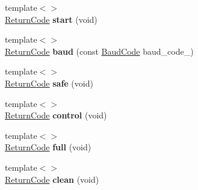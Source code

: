 \begin{DoxyCompactItemize}
\item 
\hypertarget{classroomba_1_1_open_interface_a96b78c979bf8aa82f4c76f0d156fb7f4}{{\footnotesize template$<$$>$ }\\\hyperlink{namespaceroomba_aff53babe0af88b1ea8b066fd18b8f23f}{Return\+Code} {\bfseries start} (void)}\label{classroomba_1_1_open_interface_a96b78c979bf8aa82f4c76f0d156fb7f4}

\item 
\hypertarget{classroomba_1_1_open_interface_a71f4bcde46126e045681d55437927dad}{{\footnotesize template$<$$>$ }\\\hyperlink{namespaceroomba_aff53babe0af88b1ea8b066fd18b8f23f}{Return\+Code} {\bfseries baud} (const \hyperlink{namespaceroomba_a303ba447b12fc77bc24977a1a7ec6d6c}{Baud\+Code} baud\+\_\+code\+\_\+)}\label{classroomba_1_1_open_interface_a71f4bcde46126e045681d55437927dad}

\item 
\hypertarget{classroomba_1_1_open_interface_a044f115b2d5bbd1dc644e71978940c60}{{\footnotesize template$<$$>$ }\\\hyperlink{namespaceroomba_aff53babe0af88b1ea8b066fd18b8f23f}{Return\+Code} {\bfseries safe} (void)}\label{classroomba_1_1_open_interface_a044f115b2d5bbd1dc644e71978940c60}

\item 
\hypertarget{classroomba_1_1_open_interface_a0c5f4aedca9850d8b60f9219b0062ae6}{{\footnotesize template$<$$>$ }\\\hyperlink{namespaceroomba_aff53babe0af88b1ea8b066fd18b8f23f}{Return\+Code} {\bfseries control} (void)}\label{classroomba_1_1_open_interface_a0c5f4aedca9850d8b60f9219b0062ae6}

\item 
\hypertarget{classroomba_1_1_open_interface_a488b017d3ab307abd518252d79c03a74}{{\footnotesize template$<$$>$ }\\\hyperlink{namespaceroomba_aff53babe0af88b1ea8b066fd18b8f23f}{Return\+Code} {\bfseries full} (void)}\label{classroomba_1_1_open_interface_a488b017d3ab307abd518252d79c03a74}

\item 
\hypertarget{classroomba_1_1_open_interface_a8e98d112f2f4da24418a37ac78522b84}{{\footnotesize template$<$$>$ }\\\hyperlink{namespaceroomba_aff53babe0af88b1ea8b066fd18b8f23f}{Return\+Code} {\bfseries clean} (void)}\label{classroomba_1_1_open_interface_a8e98d112f2f4da24418a37ac78522b84}


\end{DoxyCompactItemize}
